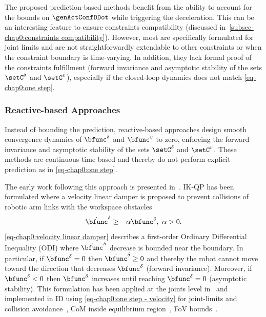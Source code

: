 The proposed prediction-based methods benefit from the ability to account for the bounds on $\genActConfDDot$ while triggering the deceleration. This can be an interesting feature to ensure constraints compatibility (discussed in~\cref{subsec-chap0:constraints compatibility}). However, most are specifically formulated for joint limits and are not straightforwardly extendable to other constraints or when the constraint boundary is time-varying. In addition, they lack formal proof of the constraints fulfillment (forward invariance and asymptotic stability of the sets $\setC^{\delta}$ and $\setC^{v}$), especially if the closed-loop dynamics does not match \cref{eq-chap0:one step}. 
\subsubsection{Reactive-based Approaches}
Instead of bounding the prediction, reactive-based approaches design smooth convergence dynamics of $\bfunc^{\delta}$ and $\bfunc^{v}$ to zero, enforcing the forward invariance and asymptotic stability of the sets $\setC^{\delta}$ and $\setC^{v}$. These methods are continuous-time based and thereby do not perform explicit prediction as in \cref{eq-chap0:one step}. %

The early work following this approach is presented in~\cite{faverjon1987icra}. IK-QP has been formulated where a   velocity linear damper is proposed to prevent collisions of robotic arm links with the workspace obstacles 
\begin{equation}\label{eq-chap0:velocity linear damper}
	\dot{\bfunc}^{\delta}\geq -\alpha \bfunc^{\delta}, \ \alpha>0.
\end{equation}
\cref{eq-chap0:velocity linear damper} describes a first-order Ordinary Differential Inequality (ODI) where $\dot{\bfunc}^{\delta}$ decrease  is bounded near the boundary. In particular,  if $\bfunc^{\delta} =0$ then $\dot{\bfunc}^{\delta}\geq0$ and thereby the robot cannot move toward the direction that decreases $\bfunc^{\delta}$ (forward invariance). Moreover, if $\bfunc^{\delta}<0$ then  $\bfunc^{\delta}$ increases until reaching $\bfunc^{\delta}=0$ (asymptotic stability). 
This formulation has been applied at the joints level in~\cite{kanehiro2010iros} and implemented in ID using \cref{eq-chap0:one step - velocity} for joint-limits and collision avoidance~\cite{vaillant2016springer}, CoM inside equilibrium region~\cite{audren2016humanoids}, FoV bounds~\cite{agravante2017ral}. 

